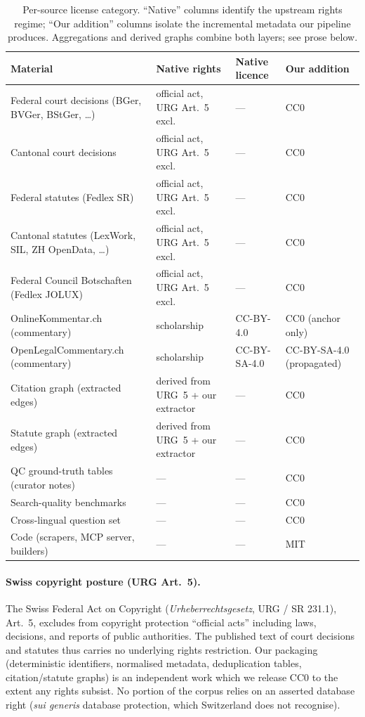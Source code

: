 \begin{table}[h!]
\centering
\caption{Per-source license category. ``Native'' columns identify the
upstream rights regime; ``Our addition'' columns isolate the
incremental metadata our pipeline produces. Aggregations and derived
graphs combine both layers; see prose below.}
\label{tab:license_matrix}
\begin{tabular}{l l l l}
\toprule
Material & Native rights & Native licence & Our addition \\
\midrule
Federal court decisions (BGer, BVGer, BStGer, \dots) & official act, URG Art.~5 excl. & --- & CC0 \\
Cantonal court decisions & official act, URG Art.~5 excl. & --- & CC0 \\
Federal statutes (Fedlex SR) & official act, URG Art.~5 excl. & --- & CC0 \\
Cantonal statutes (LexWork, SIL, ZH OpenData, \dots) & official act, URG Art.~5 excl. & --- & CC0 \\
Federal Council Botschaften (Fedlex JOLUX) & official act, URG Art.~5 excl. & --- & CC0 \\
OnlineKommentar.ch (commentary) & scholarship & CC-BY-4.0 & CC0 (anchor only) \\
OpenLegalCommentary.ch (commentary) & scholarship & CC-BY-SA-4.0 & CC-BY-SA-4.0 (propagated) \\
Citation graph (extracted edges) & derived from URG~5 + our extractor & --- & CC0 \\
Statute graph (extracted edges) & derived from URG~5 + our extractor & --- & CC0 \\
QC ground-truth tables (curator notes) & --- & --- & CC0 \\
Search-quality benchmarks & --- & --- & CC0 \\
Cross-lingual question set & --- & --- & CC0 \\
Code (scrapers, MCP server, builders) & --- & --- & MIT \\
\bottomrule
\end{tabular}
\end{table}

\paragraph{Swiss copyright posture (URG Art.~5).} The Swiss Federal Act
on Copyright (\emph{Urheberrechtsgesetz}, URG / SR 231.1), Art.~5,
excludes from copyright protection ``official acts'' including laws,
decisions, and reports of public authorities. The published text of
court decisions and statutes thus carries no underlying rights restriction.
Our packaging (deterministic identifiers, normalised metadata,
deduplication tables, citation/statute graphs) is an independent work
which we release CC0 to the extent any rights subsist. No portion of
the corpus relies on an asserted database right (\emph{sui generis}
database protection, which Switzerland does not recognise).

